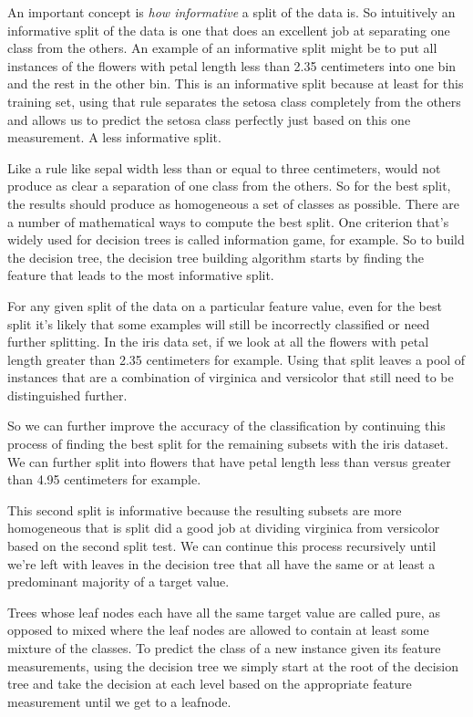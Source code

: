 \begin{multicols}{2}
An important concept is \emph{how informative} a split of the data is. So intuitively an informative split of the data is one that does an excellent job at separating one class from the others. An example of an informative split might be to put all instances of the flowers with petal length less than 2.35 centimeters into one bin and the rest in the other bin. This is an informative split because at least for this training set, using that rule separates the setosa class completely from the others and allows us to predict the setosa class perfectly just based on this one measurement. A less informative split. 

Like a rule like sepal width less than or equal to three centimeters, would not produce as clear a separation of one class from the others. So for the best split, the results should produce as homogeneous a set of classes as possible. There are a number of mathematical ways to compute the best split. One criterion that's widely used for decision trees is called information game, for example. So to build the decision tree, the decision tree building algorithm starts by finding the feature that leads to the most informative split. 

For any given split of the data on a particular feature value, even for the best split it's likely that some examples will still be incorrectly classified or need further splitting. In the iris data set, if we look at all the flowers with petal length greater than 2.35 centimeters for example. Using that split leaves a pool of instances that are a combination of virginica and versicolor that still need to be distinguished further. 

So we can further improve the accuracy of the classification by continuing this process of finding the best split for the remaining subsets with the iris dataset. We can further split into flowers that have petal length less than versus greater than 4.95 centimeters for example. 

This second split is informative because the resulting subsets are more homogeneous that is split did a good job at dividing virginica from versicolor based on the second split test. We can continue this process recursively until we're left with leaves in the decision tree that all have the same or at least a predominant majority of a target value. 

Trees whose leaf nodes each have all the same target value are called pure, as opposed to mixed where the leaf nodes are allowed to contain at least some mixture of the classes. To predict the class of a new instance given its feature measurements, using the decision tree we simply start at the root of the decision tree and take the decision at each level based on the appropriate feature measurement until we get to a leafnode. 


\end{multicols}
